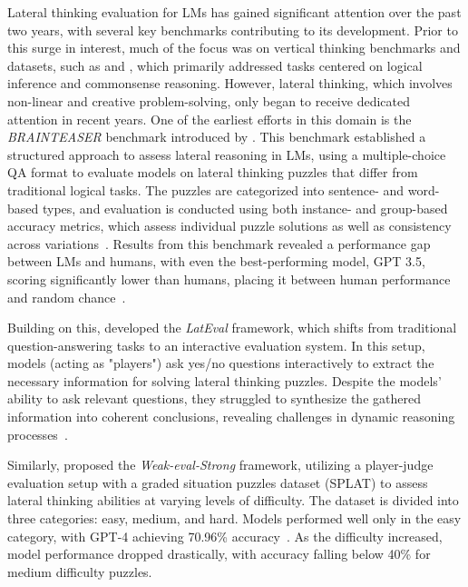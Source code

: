 Lateral thinking evaluation for \acp{LM} has gained significant attention over the past two years, with several key benchmarks contributing to its development. Prior to this surge in interest, much of the focus was on vertical thinking benchmarks and datasets, such as  and , which primarily addressed tasks centered on logical inference and commonsense reasoning. However, lateral thinking, which involves non-linear and creative problem-solving, only began to receive dedicated attention in recent years. One of the earliest efforts in this domain is the \textit{BRAINTEASER} benchmark introduced by \textcite{jiangBRAINTEASERLateralThinking2023}. This benchmark established a structured approach to assess lateral reasoning in \acp{LM}, using a multiple-choice \ac{QA} format to evaluate models on lateral thinking puzzles that differ from traditional logical tasks. The puzzles are categorized into sentence- and word-based types, and evaluation is conducted using both instance- and group-based accuracy metrics, which assess individual puzzle solutions as well as consistency across variations~\cite{jiangBRAINTEASERLateralThinking2023}. Results from this benchmark revealed a performance gap between \acp{LM} and humans, with even the best-performing model, \ac{GPT} 3.5, scoring significantly lower than humans, placing it between human performance and random chance~\cite{jiangBRAINTEASERLateralThinking2023}.

Building on this, \textcite{huangLatEvalInteractiveLLMs2024} developed the \textit{LatEval} framework, which shifts from traditional question-answering tasks to an interactive evaluation system. In this setup, models (acting as "players") ask yes/no questions interactively to extract the necessary information for solving lateral thinking puzzles. Despite the models' ability to ask relevant questions, they struggled to synthesize the gathered information into coherent conclusions, revealing challenges in dynamic reasoning processes~\cite{huangLatEvalInteractiveLLMs2024}.

Similarly, \textcite{chenWeakevalStrongEvaluatingEliciting2024} proposed the \textit{Weak-eval-Strong} framework, utilizing a player-judge evaluation setup with a graded situation puzzles dataset (SPLAT) to assess lateral thinking abilities at varying levels of difficulty. The dataset is divided into three categories: easy, medium, and hard. Models performed well only in the easy category, with \ac{GPT}-4 achieving 70.96\% accuracy~\cite{chenWeakevalStrongEvaluatingEliciting2024}. As the difficulty increased, model performance dropped drastically, with accuracy falling below 40\% for medium difficulty puzzles.

